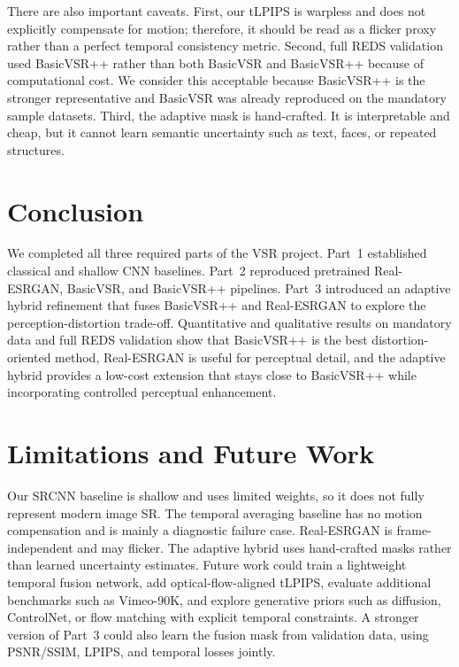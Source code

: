 \documentclass[10pt,twocolumn,letterpaper]{article}
\begin{document}
There are also important caveats. First, our tLPIPS is warpless and does not explicitly compensate for motion; therefore, it should be read as a flicker proxy rather than a perfect temporal consistency metric. Second, full REDS validation used BasicVSR++ rather than both BasicVSR and BasicVSR++ because of computational cost. We consider this acceptable because BasicVSR++ is the stronger representative and BasicVSR was already reproduced on the mandatory sample datasets. Third, the adaptive mask is hand-crafted. It is interpretable and cheap, but it cannot learn semantic uncertainty such as text, faces, or repeated structures.

\section{Conclusion}
We completed all three required parts of the VSR project. Part~1 established classical and shallow CNN baselines. Part~2 reproduced pretrained Real-ESRGAN, BasicVSR, and BasicVSR++ pipelines. Part~3 introduced an adaptive hybrid refinement that fuses BasicVSR++ and Real-ESRGAN to explore the perception-distortion trade-off. Quantitative and qualitative results on mandatory data and full REDS validation show that BasicVSR++ is the best distortion-oriented method, Real-ESRGAN is useful for perceptual detail, and the adaptive hybrid provides a low-cost extension that stays close to BasicVSR++ while incorporating controlled perceptual enhancement.

\section*{Limitations and Future Work}
Our SRCNN baseline is shallow and uses limited weights, so it does not fully represent modern image SR. The temporal averaging baseline has no motion compensation and is mainly a diagnostic failure case. Real-ESRGAN is frame-independent and may flicker. The adaptive hybrid uses hand-crafted masks rather than learned uncertainty estimates. Future work could train a lightweight temporal fusion network, add optical-flow-aligned tLPIPS, evaluate additional benchmarks such as Vimeo-90K, and explore generative priors such as diffusion, ControlNet, or flow matching with explicit temporal constraints. A stronger version of Part~3 could also learn the fusion mask from validation data, using PSNR/SSIM, LPIPS, and temporal losses jointly.

{
    \small
    
    
}
\end{document}
